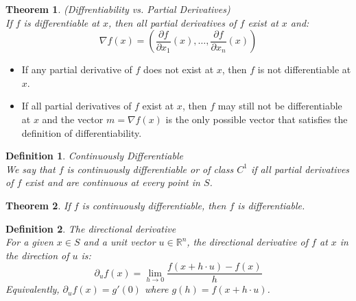 \documentclass[11pt]{book} %
\newtheorem{theorem}{Theorem}[section]
\newtheorem{definition}{Definition}[section]
\begin{document}
\bigbreak

\begin{theorem}(Diffrentiability vs. Partial Derivatives) \\
If $f$ is differentiable at $x$, then all partial derivatives of $f$ exist at $x$ and:
\begin{equation}
    \nabla f(x) = \left( \frac{\partial f}{\partial x_1}(x), \ldots, \frac{\partial f}{\partial x_n}(x) \right)
\end{equation}    
\end{theorem}

\bigbreak

\begin{itemize}
    \item If any partial derivative of $f$ does not exist at $x$, then $f$ is not differentiable at $x$.
    \item If all partial derivatives of $f$ exist at $x$, then $f$ may still not be differentiable at $x$ 
    and the vector $m = \nabla f(x)$ is the only possible vector that satisfies the definition of differentiability.
\end{itemize}

\bigbreak

\begin{definition}{Continuously Differentiable} \\
We say that $f$ is continuously differentiable or of class $C^1$  if all partial derivatives of $f$ exist and are continuous at every point in $S$.
\end{definition}

\bigbreak

\begin{theorem}
If $f$ is continuously differentiable, then $f$ is differentiable.
\end{theorem}

\bigbreak

\begin{definition}{The directional derivative} \\
For a given $x \in S$ and a unit vector $u \in \mathbb{R}^n$, the directional derivative of $f$ at $x$ in the direction of $u$ is:
\begin{equation}
    \partial_u f(x) = \lim_{h \rightarrow 0} \frac{f(x + h \cdot u) - f(x)}{h}
\end{equation}
Equivalently, $\partial_u f(x) = g'(0)$ where $g(h) = f(x + h \cdot u)$.
\end{definition}

\bigbreak
\end{document}
